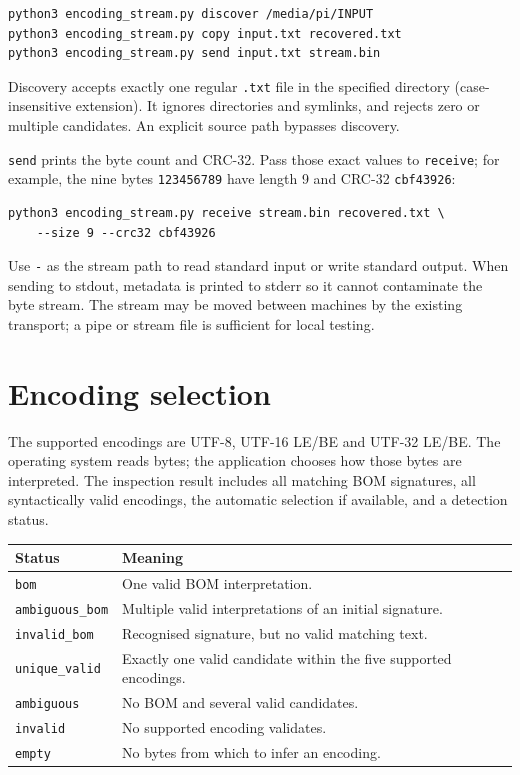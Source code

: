 \documentclass[10pt,a4paper]{article}
\begin{document}
\begin{verbatim}
python3 encoding_stream.py discover /media/pi/INPUT
python3 encoding_stream.py copy input.txt recovered.txt
python3 encoding_stream.py send input.txt stream.bin
\end{verbatim}
Discovery accepts exactly one regular \texttt{.txt} file in the specified directory
(case-insensitive extension). It ignores directories and symlinks, and rejects
zero or multiple candidates. An explicit source path bypasses discovery.

\texttt{send} prints the byte count and CRC-32. Pass those exact values to
\texttt{receive}; for example, the nine bytes \texttt{123456789} have length 9 and
CRC-32 \texttt{cbf43926}:
\begin{verbatim}
python3 encoding_stream.py receive stream.bin recovered.txt \
    --size 9 --crc32 cbf43926
\end{verbatim}
Use \texttt{-} as the stream path to read standard input or write standard output.
When sending to stdout, metadata is printed to stderr so it cannot contaminate
the byte stream. The stream may be moved between machines by the existing
transport; a pipe or stream file is sufficient for local testing.

\section{Encoding selection}
The supported encodings are UTF-8, UTF-16 LE/BE and UTF-32 LE/BE. The operating
system reads bytes; the application chooses how those bytes are interpreted.
The inspection result includes all matching BOM signatures, all syntactically
valid encodings, the automatic selection if available, and a detection status.

\begin{tabularx}{\linewidth}{@{}lX@{}}
\toprule
Status & Meaning\\
\midrule
\texttt{bom} & One valid BOM interpretation.\\
\texttt{ambiguous\_bom} & Multiple valid interpretations of an initial signature.\\
\texttt{invalid\_bom} & Recognised signature, but no valid matching text.\\
\texttt{unique\_valid} & Exactly one valid candidate within the five supported encodings.\\
\texttt{ambiguous} & No BOM and several valid candidates.\\
\texttt{invalid} & No supported encoding validates.\\
\texttt{empty} & No bytes from which to infer an encoding.\\
\bottomrule
\end{tabularx}
\end{document}
